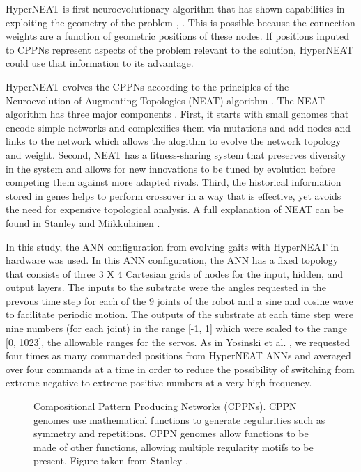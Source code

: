 HyperNEAT is first neuroevolutionary algorithm that has shown capabilities in exploiting the geometry of the problem \cite{stanley1}, \cite{clune3}.
This is possible because the connection weights are a function of geometric positions of these nodes. 
If positions inputed to CPPNs represent aspects of the problem relevant to the solution, HyperNEAT could use that information to its advantage.  


HyperNEAT evolves the CPPNs according to the principles of the Neuroevolution of Augmenting Topologies (NEAT) algorithm \cite{stanley4}. 
The NEAT algorithm has three major components \cite{stanley4}. 
First, it starts with small genomes that encode simple networks and complexifies them via mutations and add nodes and links to the network which allows the alogithm to evolve the network topology and weight. 
Second, NEAT has a fitness-sharing system that preserves diversity in the system and allows for new innovations to be tuned by evolution before competing them against more adapted rivals. 
Third, the historical information stored in genes helps to perform crossover in a way that is effective, yet avoids the need for expensive topological analysis. A full explanation of NEAT can be found in Stanley and Miikkulainen \cite{stanley4}. 


In this study, the ANN configuration from evolving gaits with HyperNEAT in hardware \cite{yos:clune} was used. 
In this ANN configuration, the ANN has a fixed topology that consists of three 3 X 4 Cartesian grids of nodes for the input, hidden, and output layers. 
The inputs to the substrate were the angles requested in the prevous time step for each of the 9 joints of the robot and a sine and cosine wave to facilitate periodic motion. 
The outputs of the substrate at each time step were nine numbers (for each joint) in the range [-1, 1] which were scaled to the range [0, 1023], the allowable ranges for the servos. 
As in Yosinski et al. \cite{yos:clune}, we requested four times as many commanded positions from HyperNEAT ANNs and averaged over four commands at a time in order to reduce the possibility of switching from extreme negative to extreme positive numbers at a very high frequency. 


\begin{figure}
\begin{center}
\vspace{1cm}
\caption [ ]{Compositional Pattern Producing Networks (CPPNs). CPPN  genomes use mathematical functions to generate regularities such as symmetry and repetitions. CPPN genomes allow functions to be made of other functions, allowing multiple regularity motifs to be present. Figure taken from Stanley \cite{stanley2}.}
\end{center}
\end{figure}

